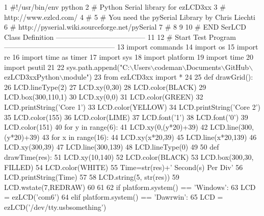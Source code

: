 \begin{DoxyCodeInclude}
1 \textcolor{comment}{#!/usr/bin/env python}
2 \textcolor{comment}{# Python Serial library for ezLCD3xx}
3 \textcolor{comment}{# http://www.ezlcd.com/}
4 \textcolor{comment}{#}
5 \textcolor{comment}{# You need the pySerial Library by Chris Liechti}
6 \textcolor{comment}{# http://pyserial.wiki.sourceforge.net/pySerial}
7 \textcolor{comment}{#}
8 
9 
10 \textcolor{comment}{# END SerLCD Class Definition --------------------------------------}
11 
12 \textcolor{comment}{# Start Test Program -----------------------------------------------}
13 \textcolor{keyword}{import} commands
14 \textcolor{keyword}{import} os
15 \textcolor{keyword}{import} re
16 \textcolor{keyword}{import} time \textcolor{keyword}{as} timer
17 \textcolor{keyword}{import} sys
18 \textcolor{keyword}{import} platform
19 \textcolor{keyword}{import} time
20 \textcolor{keyword}{import} psutil
21     
22 sys.path.append(\textcolor{stringliteral}{"C:\(\backslash\)Users\(\backslash\)codeman\(\backslash\)Documents\(\backslash\)GitHub\(\backslash\)ezLCD3xxPython\(\backslash\)module"}) 
23 \textcolor{keyword}{from} ezLCD3xx \textcolor{keyword}{import} *
24 
25 \textcolor{keyword}{def }drawGrid():
26     LCD.lineType(2)
27     LCD.xy(0,30)
28     LCD.color(BLACK)
29     LCD.box(300,110,1)
30     LCD.xy(0,0)
31     LCD.color(GREEN)
32     LCD.printString(\textcolor{stringliteral}{'Core 1'})
33     LCD.color(YELLOW)
34     LCD.printString(\textcolor{stringliteral}{'Core 2'})
35     LCD.color(155)
36     LCD.color(LIME)
37     LCD.font(\textcolor{stringliteral}{'1'})
38     LCD.font(\textcolor{stringliteral}{'0'})
39     LCD.color(151)
40     \textcolor{keywordflow}{for} y \textcolor{keywordflow}{in} range(6):
41         LCD.xy(0,(y*20)+39)
42         LCD.line(300,(y*20)+39)
43     \textcolor{keywordflow}{for} x \textcolor{keywordflow}{in} range(16):
44         LCD.xy(x*20,39)
45         LCD.line(x*20,139)
46     LCD.xy(300,39)
47     LCD.line(300,139)
48     LCD.lineType(0)
49     
50 \textcolor{keyword}{def }drawTime(res):
51     LCD.xy(10,140)
52     LCD.color(BLACK)
53     LCD.box(300,30, FILLED)
54     LCD.color(WHITE)
55     Time=str(res)+\textcolor{stringliteral}{' Second(s) Per Div'}
56     LCD.printString(Time)
57 
58     LCD.string(5, str(res))
59     LCD.wstate(7,REDRAW)
60 
61 
62 \textcolor{keywordflow}{if} platform.system() == \textcolor{stringliteral}{'Windows'}:
63     LCD = ezLCD(\textcolor{stringliteral}{'com6'}) 
64 \textcolor{keywordflow}{elif} platform.system() == \textcolor{stringliteral}{'Dawrwin'}:
65     LCD = ezLCD(\textcolor{stringliteral}{'/dev/tty.usbsomething'})

\end{DoxyCodeInclude}
